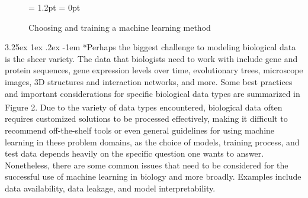 \documentclass{article}
\makeatletter
\renewcommand\paragraph{\@startsection{paragraph}{4}{\z@}%
	{3.25ex \@plus1ex \@minus.2ex}%
	{-1em}%
	{\normalfont\normalsize}}
\makeatother
\begin{document}
		\begin{figure}[hbtp]
			\centering 
			\fboxrule = 1.2pt 
			\fboxsep = 0pt 
			\caption{Choosing and training a machine learning method}	
		\end{figure}
		
		\paragraph*{Perhaps the biggest challenge to modeling biological data is the sheer variety. The data that biologists need to work with include gene and protein sequences, gene expression levels over time, evolutionary trees, microscope images, 3D structures and interaction networks, and more. Some best practices and important considerations for specific biological data types are summarized in Figure 2\textsuperscript{\cite{ref5}}. Due to the variety of data types encountered, biological data often requires customized solutions to be processed effectively, making it difficult to recommend off-the-shelf tools or even general guidelines for using machine learning in these problem domains, as the choice of models, training process, and test data depends heavily on the specific question one wants to answer. Nonetheless, there are some common issues that need to be considered for the successful use of machine learning in biology and more broadly. Examples include data availability, data leakage, and model interpretability.}
		
\end{document}
